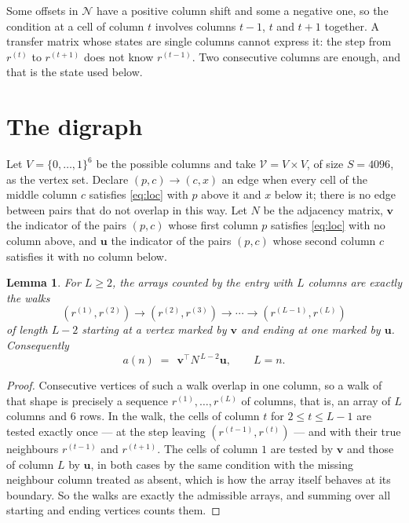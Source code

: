\documentclass[11pt,a4paper]{article}
\theoremstyle{plain}
\newtheorem{lemma}[theorem]{Lemma}
\theoremstyle{definition}
\begin{document}
Some offsets in $\mathcal N$ have a positive column shift and some a negative one, so the
condition at a cell of column $t$ involves columns $t-1$, $t$ and $t+1$ together. A transfer
matrix whose states are single columns cannot express it: the step from $r^{(t)}$ to
$r^{(t+1)}$ does not know $r^{(t-1)}$. Two consecutive columns are enough, and that is
the state used below.

\section{The digraph}

Let $V=\{0,\dots,1\}^{6}$ be the possible columns and take
$\mathcal V=V\times V$, of size $S=4096$, as the vertex set. Declare $(p,c)\to(c,x)$ an edge
when every cell of the middle column $c$ satisfies \eqref{eq:loc} with $p$ above it and $x$
below it; there is no edge between pairs that do not overlap in this way. Let $N$ be the
adjacency matrix, $\mathbf{v}$ the indicator of the pairs $(p,c)$ whose first column $p$
satisfies \eqref{eq:loc} with no column above, and $\mathbf{u}$ the indicator of
the pairs $(p,c)$ whose second column $c$ satisfies it with no column below.

\begin{lemma}\label{lem:walk}
For $L\ge2$, the arrays counted by the entry with $L$ columns are exactly the walks
\[
(r^{(1)},r^{(2)})\to(r^{(2)},r^{(3)})\to\cdots\to(r^{(L-1)},r^{(L)})
\]
of length $L-2$ starting at a vertex marked by $\mathbf{v}$ and ending at one marked by
$\mathbf{u}$. Consequently
\[
a(n)\;=\;\,\mathbf{v}^{\!\top}N^{\,L-2}\mathbf{u},\qquad L=n .
\]
\end{lemma}

\begin{proof}
Consecutive vertices of such a walk overlap in one column, so a walk of that shape is
precisely a sequence $r^{(1)},\dots,r^{(L)}$ of columns, that is, an array of $L$ columns
and $6$ rows. In the walk, the cells of column $t$ for $2\le t\le L-1$ are tested
exactly once --- at the step leaving $(r^{(t-1)},r^{(t)})$ --- and with their true
neighbours $r^{(t-1)}$ and $r^{(t+1)}$. The cells of column $1$ are tested by
$\mathbf{v}$ and those of column $L$ by $\mathbf{u}$, in both cases by the same condition
with the missing neighbour column treated as absent, which is how the array itself behaves at
its boundary. So the walks are exactly the admissible arrays, and summing over all starting
and ending vertices counts them.
\end{proof}
\end{document}
